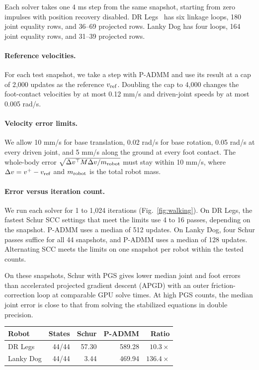 \documentclass[conference]{IEEEtran}
\makeatletter
\newenvironment{placedtable}{%
  \par\noindent\begin{minipage}{\columnwidth}\centering\def\@captype{table}%
}{\end{minipage}\par\medskip}
\makeatother
\begin{document}
Each solver takes one 4 ms step from the same snapshot, starting from zero impulses with position recovery disabled. DR Legs~\citep{gim} has six linkage loops, 180 joint equality rows, and 36--69 projected rows. Lanky Dog has four loops, 164 joint equality rows, and 31--39 projected rows.

\paragraph{Reference velocities.} For each test snapshot, we take a step with P-ADMM and use its result at a cap of 2,000 updates as the reference \(v_{\rm ref}\). Doubling the cap to 4,000 changes the foot-contact velocities by at most 0.12 mm/s and driven-joint speeds by at most 0.005 rad/s.

\paragraph{Velocity error limits.} We allow 10 mm/s for base translation, 0.02 rad/s for base rotation, 0.05 rad/s at every driven joint, and 5 mm/s along the ground at every foot contact. The whole-body error \(\sqrt{\Delta v^\top M\Delta v/m_{\rm robot}}\) must stay within 10 mm/s, where \(\Delta v=v^+-v_{\rm ref}\) and \(m_{\rm robot}\) is the total robot mass.

\paragraph{Error versus iteration count.} We run each solver for 1 to 1,024 iterations (Fig.~\ref{fig:walking}). On DR Legs, the fastest Schur SCC settings that meet the limits use 4 to 16 passes, depending on the snapshot. P-ADMM uses a median of 512 updates. On Lanky Dog, four Schur passes suffice for all 44 snapshots, and P-ADMM uses a median of 128 updates. Alternating SCC meets the limits on one snapshot per robot within the tested counts.

On these snapshots, Schur with PGS gives lower median joint and foot errors than accelerated projected gradient descent (APGD) with an outer friction-correction loop at comparable GPU solve times. At high PGS counts, the median joint error is close to that from solving the stabilized equations in double precision.

\begin{placedtable}
\caption{GPU time for one complete step across 1,024 parallel environments, in ms. Both solvers meet the velocity limits on all 44 test snapshots per robot.}
\label{tab:timing}
\begin{tabular}{@{}lrrrr@{}}
\toprule
Robot & States & Schur & P-ADMM & Ratio\\\midrule
DR Legs & 44/44 & 57.30 & 589.28 & \(10.3\times\)\\
Lanky Dog & 44/44 & 3.44 & 469.94 & \(136.4\times\)\\\bottomrule
\end{tabular}
\end{placedtable}
\end{document}
